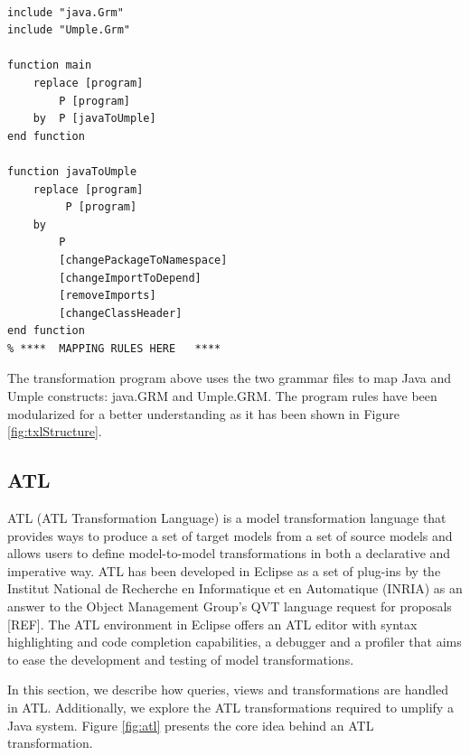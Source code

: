 \begin{lstlisting}[style=umplePlain, label=lst:mainProgramtxl, caption=The ATL main program - JavaToUmple.Txl] 

include "java.Grm" 
include "Umple.Grm" 

function main    
    replace [program]
        P [program]     
    by 	P [javaToUmple]
end function 

function javaToUmple   
    replace [program] 
         P [program]     
    by 
        P 
        [changePackageToNamespace] 
        [changeImportToDepend] 
        [removeImports] 
        [changeClassHeader]
end function 
% ****	MAPPING RULES HERE   ****
\end{lstlisting}

The transformation program above uses the two grammar files to map Java and Umple constructs:  java.GRM and Umple.GRM. The program rules have been modularized for a better understanding as it has been shown in Figure \ref{fig:txlStructure}.

\subsection{ATL}

ATL (ATL Transformation Language) \cite{atl} is a model transformation language that provides ways to produce a set of target models from a set of source models and allows users to define model-to-model transformations in both a declarative and imperative way.
ATL has been developed in Eclipse as a set of plug-ins by the Institut National de Recherche en Informatique et en Automatique (INRIA) as an answer to the Object Management Group's QVT language request for proposals [REF].  The ATL environment in Eclipse offers an ATL editor with syntax highlighting and code completion capabilities, a debugger and a profiler that aims to ease the development and testing of model transformations.

In this section, we describe how queries, views and transformations are handled in ATL. Additionally, we explore the ATL transformations required to umplify a Java system. Figure \ref{fig:atl} presents the core idea behind an ATL transformation.

